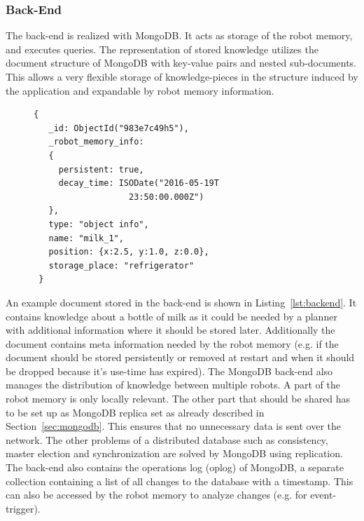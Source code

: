 \documentclass[a4paper,11pt]{article}
\newcommand{\refsec}[1]{Section~\ref{#1}}
\newcommand{\reflst}[1]{Listing~\ref{#1}}
\begin{document}
\subsubsection{Back-End}
\label{sec:back-end}
The back-end is realized with MongoDB. It acts as storage of the robot
memory, and executes queries. The representation of stored knowledge
utilizes the document structure of MongoDB with key-value pairs and
nested sub-documents. This allows a very flexible storage of
knowledge-pieces in the structure induced by the application and
expandable by robot memory information.
\begin{figure}
\begin{lstlisting}[style=SmallJSON,
  caption={Representation of a knowledge piece in the back-end},
  label=lst:backend,
  framexleftmargin=1pt, xleftmargin=0pt,
 morekeywords={}, numbers=none]
 {
   _id: ObjectId("983e7c49h5"),
   _robot_memory_info:
   {
     persistent: true,
     decay_time: ISODate("2016-05-19T
                   23:50:00.000Z")
   },
   type: "object info",
   name: "milk_1",
   position: {x:2.5, y:1.0, z:0.0},
   storage_place: "refrigerator"
 }
\end{lstlisting}
\end{figure}
An example document stored in the back-end is shown in
\reflst{lst:backend}.  It contains knowledge about a bottle of milk as
it could be needed by a planner with additional information where it
should be stored later. Additionally the document contains meta
information needed by the robot memory (e.g. if the document should be
stored persistently or removed at restart and when it should be
dropped because it's use-time has expired). The MongoDB back-end also
manages the distribution of knowledge between multiple robots. A part
of the robot memory is only locally relevant. The other part that
should be shared has to be set up as MongoDB replica set as already
described in \refsec{sec:mongodb}. This ensures that no unnecessary
data is sent over the network. The other problems of a distributed
database such as consistency, master election and synchronization are
solved by MongoDB using replication. The back-end also contains the
operations log (oplog) of MongoDB, a separate
collection containing a list of all changes to the database with a
timestamp. This can also be accessed by the robot memory to analyze
changes (e.g. for event-trigger).
\end{document}
